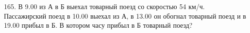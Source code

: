 165. В 9.00 из А в Б выехал товарный поезд со скоростью 54 км/ч. Пассажирский поезд в 10.00 выехал из А, в 13.00 он обогнал товарный поезд и в 19.00 прибыл в Б. В котором часу прибыл в Б товарный поезд?\\
